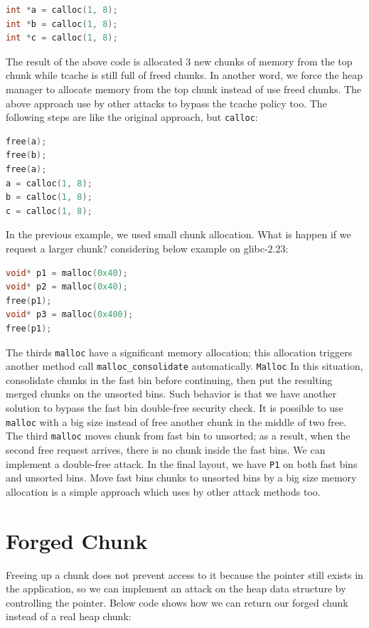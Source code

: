 \documentclass{masterthesis}
\newcommand*\libc{glibc}
\newcommand*\tch{tcache}
\newcommand*\fb{fast bins}
\newcommand*\ub{unsorted bins}
\newcommand*\mallocc{\lstinline{malloc}\xspace}
\newcommand*\callocc{\lstinline{calloc}\xspace}
\newcommand*\Mallocc{\lstinline{Malloc}\xspace}
\begin{document}
\begin{lstlisting}[language=c,frame=tlrb]
int *a = calloc(1, 8);
int *b = calloc(1, 8);
int *c = calloc(1, 8);
\end{lstlisting}

The result of the above code is allocated 3 new chunks of memory from the top chunk while \tch{} is still full of freed chunks. In another word, we force the heap manager to allocate memory from the top chunk instead of use freed chunks. The above approach use by other attacks to bypass the \tch{} policy too. The following steps are like the original approach, but \callocc{}:

\begin{lstlisting}[language=c,frame=tlrb]
free(a);
free(b);
free(a);
a = calloc(1, 8);
b = calloc(1, 8);
c = calloc(1, 8);
\end{lstlisting}

In the previous example, we used small chunk allocation. What is happen if we request a larger chunk? considering below example on \libc{-2.23}:

\begin{lstlisting}[language=c,frame=tlrb]
void* p1 = malloc(0x40);
void* p2 = malloc(0x40);
free(p1);
void* p3 = malloc(0x400);
free(p1);
\end{lstlisting}

The thirds \mallocc{} have a significant memory allocation; this allocation triggers another method call \lstinline{malloc_consolidate} automatically. \Mallocc{} In this situation, consolidate chunks in the fast bin before continuing, then put the resulting merged chunks on the \ub{}.
Such behavior is that we have another solution to bypass the fast bin double-free security check. It is possible to use \mallocc{} with a big size instead of free another chunk in the middle of two free. The third \mallocc{} moves chunk from fast bin to unsorted; as a result, when the second free request arrives, there is no chunk inside the \fb{}. We can implement a double-free attack. In the final layout, we have \lstinline{P1} on both \fb{} and \ub{}. Move \fb{} chunks to \ub{} by a big size memory allocation is a simple approach which uses by other attack methods too.

\section{Forged Chunk}
Freeing up a chunk does not prevent access to it because the pointer still exists in the application, so we can implement an attack on the heap data structure by controlling the pointer. Below code shows how we can return our forged chunk instead of a real heap chunk:
\end{document}
